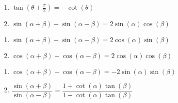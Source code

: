 \documentclass{ximera}
\begin{document}
\begin{multicols}{2}

\begin{enumerate}

\setcounter{enumi}{\value{HW}}

\item $\tan\left(\theta + \frac{\pi}{2} \right) = -\cot(\theta)$
\item $\sin(\alpha + \beta) + \sin(\alpha - \beta) = 2\sin(\alpha)\cos(\beta)$ 

\setcounter{HW}{\value{enumi}}

\end{enumerate}

\end{multicols}

\begin{multicols}{2}

\begin{enumerate}

\setcounter{enumi}{\value{HW}}

\item $\sin(\alpha + \beta) - \sin(\alpha - \beta) = 2\cos(\alpha) \sin(\beta)$
\item $\cos(\alpha + \beta) + \cos(\alpha - \beta) = 2\cos(\alpha) \cos(\beta)$

\setcounter{HW}{\value{enumi}}

\end{enumerate}

\end{multicols}

\begin{multicols}{2}

\begin{enumerate}

\setcounter{enumi}{\value{HW}}

\item $\cos(\alpha + \beta) - \cos(\alpha - \beta) = -2\sin(\alpha) \sin(\beta)$ \vphantom{$\dfrac{\sin(\alpha+\beta)}{\sin(\alpha-\beta)}$}
\item $\dfrac{\sin(\alpha+\beta)}{\sin(\alpha-\beta)} = \dfrac{1+\cot(\alpha) \tan(\beta)}{1 - \cot(\alpha) \tan(\beta)}$ 

\setcounter{HW}{\value{enumi}}

\end{enumerate}

\end{multicols}
\end{document}
